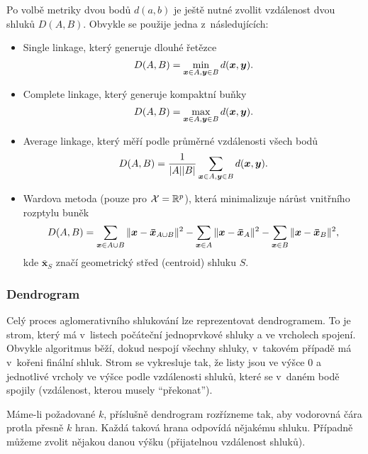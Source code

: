 Po volbě metriky dvou bodů $d(a, b)$ je ještě nutné zvollit vzdálenost dvou shluků $D(A, B)$. Obvykle se použije jedna z~následujících:
\begin{itemize}

    \item Single linkage, který generuje dlouhé řetězce
          \[
              D(A, B) = \min_{\bm{x} \in A,\bm{y} \in B} d(\bm{x}, \bm{y}).
          \]

    \item Complete linkage, který generuje kompaktní buňky
          \[
              D(A, B) = \max_{\bm{x} \in A,\bm{y} \in B} d(\bm{x}, \bm{y}).
          \]

    \item Average linkage, který měří podle průměrné vzdálenosti všech bodů
          \[
              D(A, B) = \frac{1}{|A| |B|} \sum_{\bm{x} \in A,\bm{y} \in B} d(\bm{x}, \bm{y}).
          \]

    \item Wardova metoda (pouze pro $\mathcal{X} = \mathbb{R}^p$), která minimalizuje nárůst vnitřního rozptylu buněk
          \[
              D(A, B) = \sum_{\bm{x} \in A \cup B} \|\bm{x} - \bm{\bar{x}}_{A \cup B} \|^2
              - \sum_{\bm{x} \in A} \|\bm{x} - \bm{\bar{x}}_A \|^2
              - \sum_{\bm{x} \in B} \|\bm{x} - \bm{\bar{x}}_B \|^2,
          \]
          kde $\bm{\bar{x}}_S$ značí geometrický střed (centroid) shluku $S$.

\end{itemize}

\subsubsection{Dendrogram}

Celý proces aglomerativního shlukování lze reprezentovat dendrogramem. To je strom, který má v~listech počáteční jednoprvkové shluky a ve vrcholech spojení. Obvykle algoritmus běží, dokud nespojí všechny shluky, v~takovém případě má v~kořeni finální shluk. Strom se vykresluje tak, že listy jsou ve výšce 0 a jednotlivé vrcholy ve výšce podle vzdálenosti shluků, které se v~daném bodě spojily (vzdálenost, kterou musely ``překonat'').

\begin{center}
    \scalebox{0.7}{}
\end{center}

Máme-li požadované $k$, příslušně dendrogram rozřízneme tak, aby vodorovná čára protla přesně $k$ hran. Každá taková hrana odpovídá nějakému shluku. Případně můžeme zvolit nějakou danou výšku (přijatelnou vzdálenost shluků).

